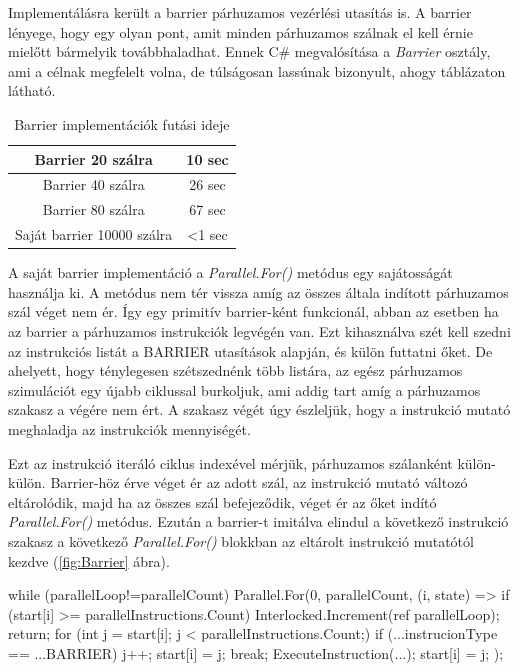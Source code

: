 Implementálásra került a barrier párhuzamos vezérlési utasítás is. A barrier lényege,  hogy egy olyan pont, amit minden párhuzamos szálnak el kell érnie mielőtt bármelyik továbbhaladhat. Ennek C\# megvalósítása a \textit{Barrier} osztály, ami a célnak megfelelt volna, de túlságosan lassúnak bizonyult, ahogy  táblázaton látható.



\begin{table}[h]
\centering
\caption{Barrier implementációk futási ideje}
\label{tab:barrier}
\begin{tabular}{|c|c|}
\hline
Barrier 20 szálra & 10 sec  \\
\hline
Barrier 40 szálra & 26 sec \\
\hline
Barrier 80 szálra & 67 sec \\
\hline 
Saját barrier 10000 szálra & <1 sec \\
\hline
\end{tabular}
\end{table}

A saját barrier implementáció a \textit{Parallel.For()} metódus egy sajátosságát használja ki. A metódus nem tér vissza amíg az összes általa indított párhuzamos szál véget nem ér. Így egy primitív barrier-ként funkcionál, abban az esetben ha az barrier a párhuzamos instrukciók legvégén van. Ezt kihasználva szét kell szedni az instrukciós listát a BARRIER utasítások alapján, és külön futtatni őket. De ahelyett, hogy ténylegesen szétszednénk több listára, az egész párhuzamos szimulációt egy újabb ciklussal burkoljuk, ami addig tart amíg a párhuzamos szakasz a végére nem ért. A szakasz végét úgy észleljük, hogy a instrukció mutató meghaladja az instrukciók mennyiségét. 

Ezt az instrukció iteráló ciklus indexével mérjük, párhuzamos szálanként külön-külön. Barrier-höz érve véget ér az adott szál, az instrukció mutató változó eltárolódik, majd ha az összes szál befejeződik, véget ér az őket indító \textit{Parallel.For()} metódus. Ezután a barrier-t imitálva elindul a következő instrukció szakasz a következő \textit{Parallel.For()} blokkban az eltárolt instrukció mutatótól kezdve (\ref{fig:Barrier} ábra). 



\begin{cpp}
while (parallelLoop!=parallelCount)
    {
        Parallel.For(0, parallelCount, (i, state) =>
        {
            if (start[i] >= parallelInstructions.Count)
            {
                Interlocked.Increment(ref parallelLoop);
                return;
            } 
            for (int j = start[i]; j < parallelInstructions.Count;)
            {
                if (...instrucionType == ...BARRIER)
                   {
                       j++;
                       start[i] = j;
                       break;
                   }
                ExecuteInstruction(...);
                start[i] = j;
            }
        });
    }
\end{cpp}

